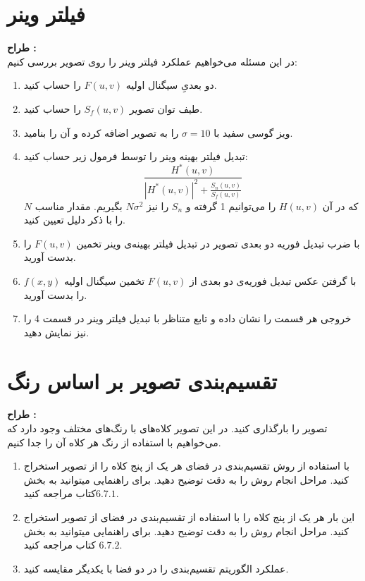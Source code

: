 \documentclass[a4paper]{article}
\begin{document}
\section{فیلتر وینر}
\textbf{طراح : }
\vspace{0.5cm}
\\
در این مسئله می‌خواهیم عملکرد فیلتر وینر را روی تصویر
 بررسی کنیم:
\begin{enumerate}
	\item 
	 دو بعدیِ سیگنال اولیه
	  $ F(u,v) $
	   را حساب کنید.
	\item 
	طیف توان تصویر 
	$ S_{f}(u,v) $
	 را حساب کنید.
	\item 
	ویز گوسی سفید با
	 $ \sigma = 10 $ 
	 را به تصویر اضافه کرده و آن را  بنامید.
	\item 
	تبدیل فیلتر بهینه وینر را توسط فرمول زیر حساب کنید:
	\begin{equation}
		\frac{H^{*}(u,v)}{|H^{*}(u,v)|^{2}+\frac{S_{n}(u,v)}{S_{f}(u,v)}}
	\end{equation}
	که در آن 
	$ H(u,v) $
	را می‌توانیم 1 گرفته و 
	$ S_{n} $
	را نیز 
	$ N\sigma^{2} $ 
	بگیریم. مقدار مناسب $ N $ را با ذکر دلیل تعیین کنید.
	\item 
	با ضرب تبدیل فوریه دو بعدی تصویر  در تبدیل فیلتر بهینه‌ی وینر تخمین $ F(u,v) $ را بدست آورید.
	\item
	با گرفتن عکس تبدیل فوریه‌ی دو بعدی از $ F(u,v) $ تخمین سیگنال اولیه $ f(x,y) $ را بدست آورید.
	\item 
	خروجی هر قسمت را نشان داده و تابع  متناظر با تبدیل فیلتر وینر در قسمت 4 را نیز نمایش دهید.
\end{enumerate}

\section{تقسیم‌بندی تصویر بر اساس رنگ}
\textbf{طراح : }
\vspace{0.5cm}
\\
تصویر  را بارگذاری کنید. در این تصویر کلاه‌های با رنگ‌های مختلف وجود دارد که می‌خواهیم با استفاده از رنگ هر کلاه آن را جدا کنیم.
\begin{enumerate}
	\item 
با استفاده از روش تقسیم‌بندی در فضای  هر یک از پنج کلاه را از تصویر استخراج کنید. مراحل انجام روش را به دقت توضیح دهید. برای راهنمایی میتوانید به بخش $ 6.7.1  $کتاب مراجعه کنید.
	\item 
این بار هر یک از پنج کلاه را با استفاده از تقسیم‌بندی در فضای  از تصویر استخراج کنید. مراحل انجام روش را به دقت توضیح دهید. برای راهنمایی میتوانید به بخش $ 6.7.2 $ کتاب مراجعه کنید.
	\item 
	عملکرد الگوریتم تقسیم‌بندی را در دو فضا با یکدیگر مقایسه کنید.
\end{enumerate}
\end{document}
